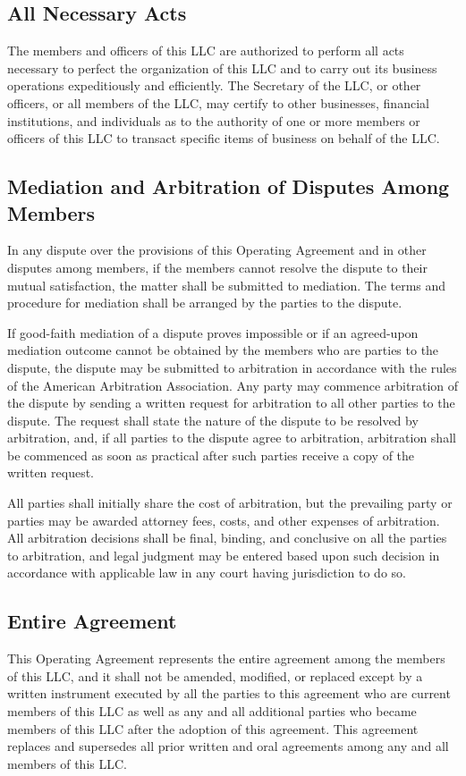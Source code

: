 \documentclass{article}
\begin{document}
			\subsection{All Necessary Acts}
			The members and officers of this LLC are authorized to perform all acts necessary to perfect the organization of this LLC and to carry out its business operations expeditiously and efficiently. The Secretary of the LLC, or other officers, or all members of the LLC, may certify to other businesses, financial institutions, and individuals as to the authority of one or more members or officers of this LLC to transact specific items of business on behalf of the LLC.

			\subsection{Mediation and Arbitration of Disputes Among Members}
			In any dispute over the provisions of this Operating Agreement and in other disputes among members, if the members cannot resolve the dispute to their mutual satisfaction, the matter shall be submitted to mediation. The terms and procedure for mediation shall be arranged by the parties to the dispute.

			\indent If good-faith mediation of a dispute proves impossible or if an agreed-upon mediation outcome cannot be obtained by the members who are parties to the dispute, the dispute may be submitted to arbitration in accordance with the rules of the American Arbitration Association. Any party may commence arbitration of the dispute by sending a written request for arbitration to all other parties to the dispute. The request shall state the nature of the dispute to be resolved by arbitration, and, if all parties to the dispute agree to arbitration, arbitration shall be commenced as soon as practical after such parties receive a copy of the written request.

			\indent All parties shall initially share the cost of arbitration, but the prevailing party or parties may be awarded attorney fees, costs, and other expenses of arbitration. All arbitration decisions shall be final, binding, and conclusive on all the parties to arbitration, and legal judgment may be entered based upon such decision in accordance with applicable law in any court having jurisdiction to do so.

			\subsection{Entire Agreement}
			This Operating Agreement represents the entire agreement among the members of this LLC, and it shall not be amended, modified, or replaced except by a written instrument executed by all the parties to this agreement who are current members of this LLC as well as any and all additional parties who became members of this LLC after the adoption of this agreement. This agreement replaces and supersedes all prior written and oral agreements among any and all members of this LLC.
\end{document}
